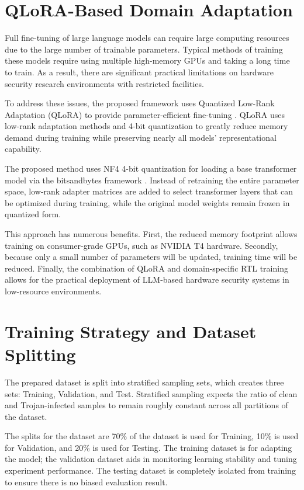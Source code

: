 \documentclass[12pt,a4paper]{report}
\begin{document}
\section{QLoRA-Based Domain Adaptation}

Full fine-tuning of large language models can require large computing resources due to the large number of trainable parameters. Typical methods of training these models require using multiple high-memory GPUs and taking a long time to train. As a result, there are significant practical limitations on hardware security research environments with restricted facilities.


To address these issues, the proposed framework uses Quantized Low-Rank Adaptation (QLoRA) to provide parameter-efficient fine-tuning \cite{ref9}. QLoRA uses low-rank adaptation methods and 4-bit quantization to greatly reduce memory demand during training while preserving nearly all models' representational capability.

The proposed method uses NF4 4-bit quantization for loading a base transformer model via the bitsandbytes framework \cite{ref9}. Instead of retraining the entire parameter space, low-rank adapter matrices are added to select transformer layers that can be optimized during training, while the original model weights remain frozen in quantized form.

This approach has numerous benefits. First, the reduced memory footprint allows training on consumer-grade GPUs, such as NVIDIA T4 hardware. Secondly, because only a small number of parameters will be updated, training time will be reduced. Finally, the combination of QLoRA and domain-specific RTL training allows for the practical deployment of LLM-based hardware security systems in low-resource environments.

\section{Training Strategy and Dataset Splitting}

The prepared dataset is split into stratified sampling sets, which creates three sets: Training, Validation, and Test. Stratified sampling expects the ratio of clean and Trojan-infected samples to remain roughly constant across all partitions of the dataset.

The splits for the dataset are 70\% of the dataset is used for Training, 10\% is used for Validation, and 20\% is used for Testing. The training dataset is for adapting the model; the validation dataset aids in monitoring learning stability and tuning experiment performance. The testing dataset is completely isolated from training to ensure there is no biased evaluation result.
\end{document}

